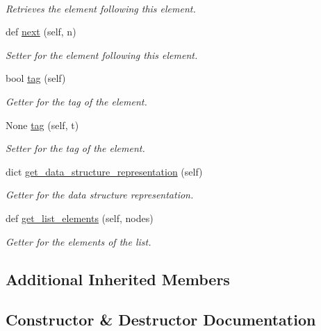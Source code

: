 \begin{DoxyCompactItemize}
$$\begin{DoxyCompactList}\small\item\em Retrieves the element following this element. \end{DoxyCompactList}\item 
def \mbox{\hyperlink{classbridges_1_1ml__element_1_1_m_lelement_a588b700bb42eb43ce3993f9715497deb}{next}} (self, n)
\begin{DoxyCompactList}\small\item\em Setter for the element following this element. \end{DoxyCompactList}\item 
bool \mbox{\hyperlink{classbridges_1_1ml__element_1_1_m_lelement_a2b5880a300ec49c905b035f0fbb606cf}{tag}} (self)
\begin{DoxyCompactList}\small\item\em Getter for the tag of the element. \end{DoxyCompactList}\item 
None \mbox{\hyperlink{classbridges_1_1ml__element_1_1_m_lelement_aa3357a7e9244614e04ac9f9da499b567}{tag}} (self, t)
\begin{DoxyCompactList}\small\item\em Setter for the tag of the element. \end{DoxyCompactList}\item 
dict \mbox{\hyperlink{classbridges_1_1ml__element_1_1_m_lelement_a962980c5497d59fb7cab10408c9c46f2}{get\+\_\+data\+\_\+structure\+\_\+representation}} (self)
\begin{DoxyCompactList}\small\item\em Getter for the data structure representation. \end{DoxyCompactList}\item 
def \mbox{\hyperlink{classbridges_1_1ml__element_1_1_m_lelement_a3996cd2cec7c3978437392eba2ef66eb}{get\+\_\+list\+\_\+elements}} (self, nodes)
\begin{DoxyCompactList}\small\item\em Getter for the elements of the list. \end{DoxyCompactList}\end{DoxyCompactItemize}
\subsection*{Additional Inherited Members}


\subsection{Constructor \& Destructor Documentation}
\mbox{\label{classbridges_1_1ml__element_1_1_m_lelement_abd5ccc3a5438e2ed1812be381f4fb8a4}} 
